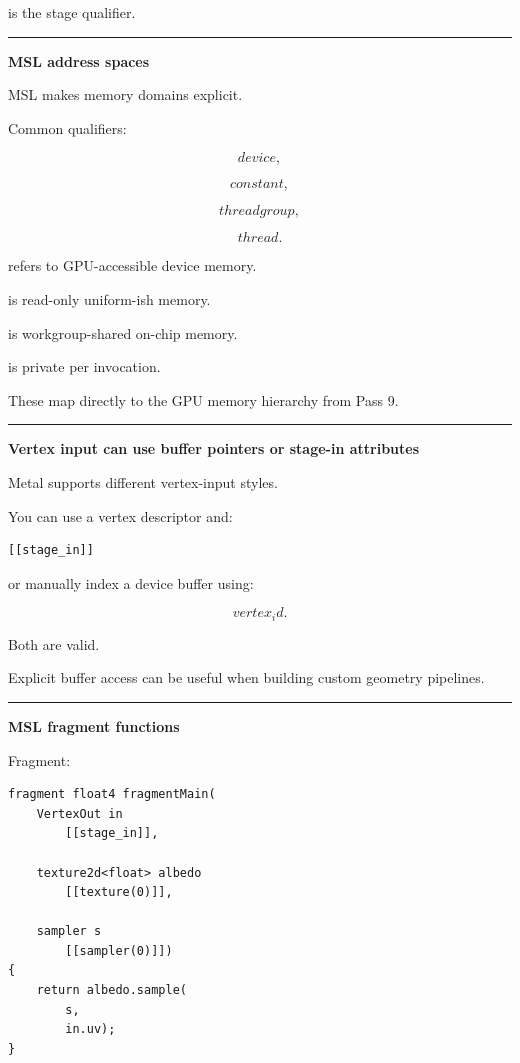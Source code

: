 is the stage qualifier.

\begin{center}\rule{0.5\linewidth}{0.5pt}\end{center}

\textbf{MSL address spaces}

MSL makes memory domains explicit.

Common qualifiers:

\[
device,
\]

\[
constant,
\]

\[
threadgroup,
\]

\[
thread.
\]

 refers to GPU-accessible device memory.

 is read-only uniform-ish memory.

 is workgroup-shared on-chip memory.

 is private per invocation.

These map directly to the GPU memory hierarchy from Pass 9.

\begin{center}\rule{0.5\linewidth}{0.5pt}\end{center}

\textbf{Vertex input can use buffer pointers or stage-in attributes}

Metal supports different vertex-input styles.

You can use a vertex descriptor and:

\begin{verbatim}
[[stage_in]]
\end{verbatim}

or manually index a device buffer using:

\[
vertex_id.
\]

Both are valid.

Explicit buffer access can be useful when building custom geometry pipelines.

\begin{center}\rule{0.5\linewidth}{0.5pt}\end{center}

\textbf{MSL fragment functions}

Fragment:

\begin{verbatim}
fragment float4 fragmentMain(
    VertexOut in
        [[stage_in]],

    texture2d<float> albedo
        [[texture(0)]],

    sampler s
        [[sampler(0)]])
{
    return albedo.sample(
        s,
        in.uv);
}
\end{verbatim}


